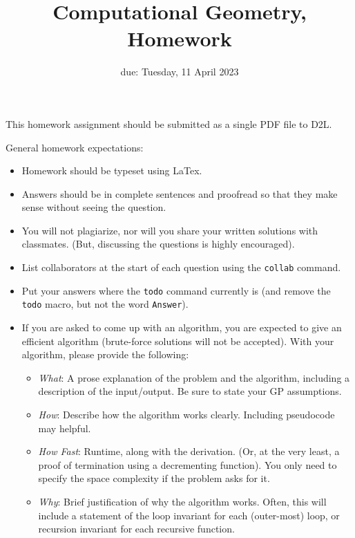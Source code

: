 \documentclass{article}
\title{Computational Geometry, Homework \hwnum}
\date{due: Tuesday, 11 April 2023}
\author{\todo{Your Name Here}}
\begin{document}
\maketitle

This homework assignment should be
submitted as a single PDF file to D2L.

General homework expectations:
\begin{itemize}
    \item Homework should be typeset using LaTex.
    \item Answers should be in complete sentences and proofread so that they
        make sense without seeing the question.
    \item You will not plagiarize, nor will you share your written solutions
        with classmates. (But, discussing the questions is highly encouraged).
    \item List collaborators at the start of each question using the
        \texttt{collab} command.
    \item Put your answers where the \texttt{todo} command currently is (and
        remove the \texttt{todo} macro, but not the word \texttt{Answer}).
    \item If you are asked to come up with an algorithm, you are
        expected to give an efficient algorithm (brute-force solutions will not
        be accepted). With your algorithm, please provide the following:
        \begin{itemize}
            \item \emph{What}: A prose explanation of the problem and the algorithm,
                including a description of the input/output.  Be sure to state
                your GP assumptions.
            \item \emph{How}: Describe how the algorithm works clearly.
                Including pseudocode may helpful.
            \item \emph{How Fast}: Runtime, along with the derivation.  (Or, at
                the very least, a proof of termination using a decrementing
                function).  You only need to specify the space complexity if the
                problem asks for it.
           \item \emph{Why}: Brief justification of why the algorithm works.
               Often, this will include a statement of the loop invariant for each
               (outer-most) loop, or recursion invariant for each recursive function.
        \end{itemize}
\end{itemize}
\end{document}
